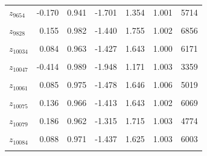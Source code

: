 \begin{longtable}{lrrrrrr}
$z_{9654}$ & -0.170 & 0.941 & -1.701 & 1.354 & 1.001 & 5714\\
\cellcolor{gray!10}{$z_{9823}$} & \cellcolor{gray!10}{-0.305} & \cellcolor{gray!10}{0.983} & \cellcolor{gray!10}{-1.873} & \cellcolor{gray!10}{1.279} & \cellcolor{gray!10}{1.001} & \cellcolor{gray!10}{4744}\\
$z_{9828}$ & 0.155 & 0.982 & -1.440 & 1.755 & 1.002 & 6856\\
\cellcolor{gray!10}{$z_{10029}$} & \cellcolor{gray!10}{0.116} & \cellcolor{gray!10}{0.992} & \cellcolor{gray!10}{-1.435} & \cellcolor{gray!10}{1.677} & \cellcolor{gray!10}{1.003} & \cellcolor{gray!10}{6236}\\
$z_{10034}$ & 0.084 & 0.963 & -1.427 & 1.643 & 1.000 & 6171\\
\cellcolor{gray!10}{$z_{10043}$} & \cellcolor{gray!10}{0.107} & \cellcolor{gray!10}{0.975} & \cellcolor{gray!10}{-1.455} & \cellcolor{gray!10}{1.667} & \cellcolor{gray!10}{1.002} & \cellcolor{gray!10}{4890}\\
$z_{10047}$ & -0.414 & 0.989 & -1.948 & 1.171 & 1.003 & 3359\\
\cellcolor{gray!10}{$z_{10053}$} & \cellcolor{gray!10}{0.053} & \cellcolor{gray!10}{0.989} & \cellcolor{gray!10}{-1.515} & \cellcolor{gray!10}{1.651} & \cellcolor{gray!10}{1.000} & \cellcolor{gray!10}{6728}\\
$z_{10061}$ & 0.085 & 0.975 & -1.478 & 1.646 & 1.006 & 5019\\
\cellcolor{gray!10}{$z_{10070}$} & \cellcolor{gray!10}{-0.141} & \cellcolor{gray!10}{0.975} & \cellcolor{gray!10}{-1.691} & \cellcolor{gray!10}{1.382} & \cellcolor{gray!10}{1.002} & \cellcolor{gray!10}{6758}\\
$z_{10075}$ & 0.136 & 0.966 & -1.413 & 1.643 & 1.002 & 6069\\
\cellcolor{gray!10}{$z_{10078}$} & \cellcolor{gray!10}{0.149} & \cellcolor{gray!10}{0.962} & \cellcolor{gray!10}{-1.408} & \cellcolor{gray!10}{1.692} & \cellcolor{gray!10}{1.004} & \cellcolor{gray!10}{4308}\\
$z_{10079}$ & 0.186 & 0.962 & -1.315 & 1.715 & 1.003 & 4774\\
\cellcolor{gray!10}{$z_{10081}$} & \cellcolor{gray!10}{0.085} & \cellcolor{gray!10}{0.972} & \cellcolor{gray!10}{-1.455} & \cellcolor{gray!10}{1.636} & \cellcolor{gray!10}{1.001} & \cellcolor{gray!10}{7497}\\
$z_{10084}$ & 0.088 & 0.971 & -1.437 & 1.625 & 1.003 & 6003\\
\cellcolor{gray!10}{$z_{10112}$} & \cellcolor{gray!10}{0.159} & \cellcolor{gray!10}{0.990} & \cellcolor{gray!10}{-1.394} & \cellcolor{gray!10}{1.707} & \cellcolor{gray!10}{1.003} & \cellcolor{gray!10}{5014}\\

\end{longtable}
